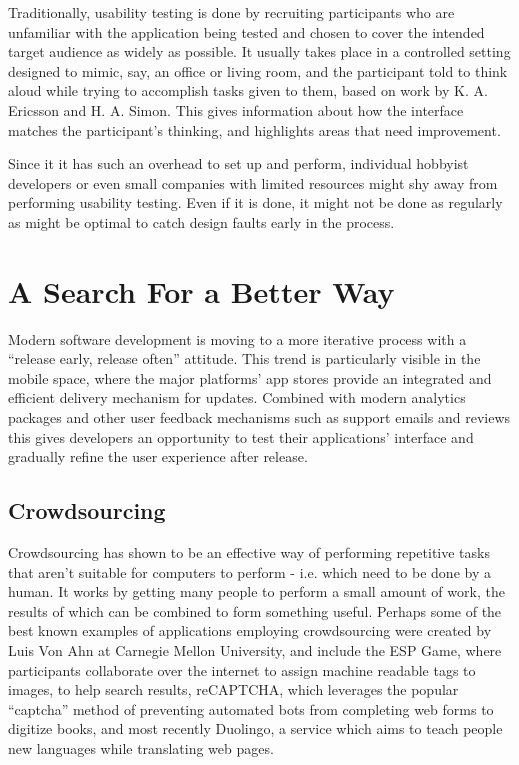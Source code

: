 Traditionally, usability testing is done by recruiting participants who are unfamiliar with the application being tested and chosen to cover the intended target audience as widely as possible. It usually takes place in a controlled setting designed to mimic, say, an office or living room, and the participant told to think aloud while trying to accomplish tasks given to them, based on work by K. A. Ericsson and H. A. Simon\cite{ericsson1980verbal}. This gives information about how the interface matches the participant’s thinking, and highlights areas that need improvement.

Since it it has such an overhead to set up and perform, individual hobbyist developers or even small companies with limited resources might shy away from performing usability testing. Even if it is done, it might not be done as regularly as might be optimal to catch design faults early in the process.

\section{A Search For a Better Way}

Modern software development is moving to a more iterative process with a “release early, release often” attitude. This trend is particularly visible in the mobile space, where the major platforms’ app stores provide an integrated and efficient delivery mechanism for updates. Combined with modern analytics packages and other user feedback mechanisms such as support emails and reviews this gives developers an opportunity to test their applications’ interface and gradually refine the user experience after release.

\subsection{Crowdsourcing}

Crowdsourcing has shown to be an effective way of performing repetitive tasks that aren't suitable for computers to perform - i.e. which need to be done by a human. It works by getting many people to perform a small amount of work, the results of which can be combined to form something useful. Perhaps some of the best known examples of applications employing crowdsourcing were created by Luis Von Ahn at Carnegie Mellon University, and include the ESP Game, where participants collaborate over the internet to assign machine readable tags to images, to help search results, reCAPTCHA, which leverages the popular “captcha” method of preventing automated bots from completing web forms to digitize books, and most recently Duolingo, a service which aims to teach people new languages while translating web pages.

